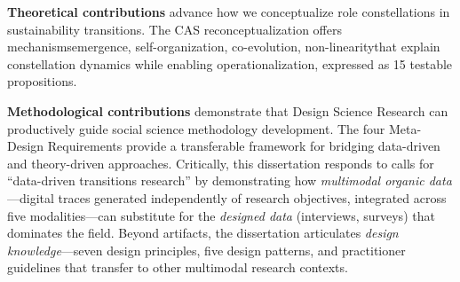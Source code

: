 \documentclass[../main.tex]{subfiles}
\begin{document}
\begin{center}
\label{fig:intro:contributions}
\end{center}

\textbf{Theoretical contributions} advance how we conceptualize role constellations in sustainability transitions. The CAS reconceptualization offers mechanisms\textemdash emergence, self-organization, co-evolution, non-linearity\textemdash that explain constellation dynamics while enabling operationalization, expressed as 15 testable propositions.

\textbf{Methodological contributions} demonstrate that Design Science Research can productively guide social science methodology development. The four Meta-Design Requirements provide a transferable framework for bridging data-driven and theory-driven approaches. Critically, this dissertation responds to calls for ``data-driven transitions research'' by demonstrating how \emph{multimodal organic data}---digital traces generated independently of research objectives, integrated across five modalities---can substitute for the \emph{designed data} (interviews, surveys) that dominates the field. Beyond artifacts, the dissertation articulates \emph{design knowledge}---seven design principles, five design patterns, and practitioner guidelines that transfer to other multimodal research contexts.
\end{document}
